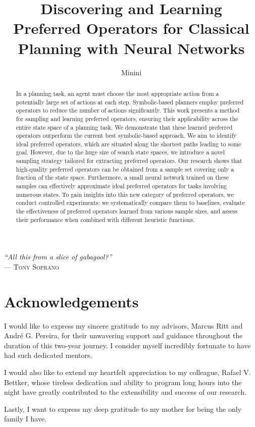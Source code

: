 \documentclass[ppgc,diss,english]{iiufrgs}
\title{Discovering and Learning Preferred Operators for Classical Planning with Neural Networks}
\author{Minini}{Pedro Probst}
\begin{document}
\maketitle

\clearpage
\begin{flushright}
\mbox{}\vfill
{\sffamily\itshape
    ``All this from a slice of gabagool?''\\}
--- \textsc{Tony Soprano}
\end{flushright}

\chapter*{Acknowledgements}

I would like to express my sincere gratitude to my advisors, Marcus Ritt and André G. Pereira, for their unwavering support and guidance throughout the duration of this two-year journey. I consider myself incredibly fortunate to have had such dedicated mentors.

I would also like to extend my heartfelt appreciation to my colleague, Rafael V. Bettker, whose tireless dedication and ability to program long hours into the night have greatly contributed to the extensibility and success of our research.

Lastly, I want to express my deep gratitude to my mother for being the only family I have.


\begin{abstract}
In a planning task, an agent must choose the most appropriate action from a potentially large set of actions at each step. Symbolic-based planners employ preferred operators to reduce the number of actions significantly. This work presents a method for sampling and learning preferred operators, ensuring their applicability across the entire state space of a planning task. We demonstrate that these learned preferred operators outperform the current best symbolic-based approach.
We aim to identify ideal preferred operators, which are situated along the shortest paths leading to some goal. However, due to the huge size of search state spaces, we introduce a novel sampling strategy tailored for extracting preferred operators. Our research shows that high-quality preferred operators can be obtained from a sample set covering only a fraction of the state space. Furthermore, a small neural network trained on these samples can effectively approximate ideal preferred operators for tasks involving numerous states.
To gain insights into this new category of preferred operators, we conduct controlled experiments: we systematically compare them to baselines, evaluate the effectiveness of preferred operators learned from various sample sizes, and assess their performance when combined with different heuristic functions.
\end{abstract}
\end{document}
